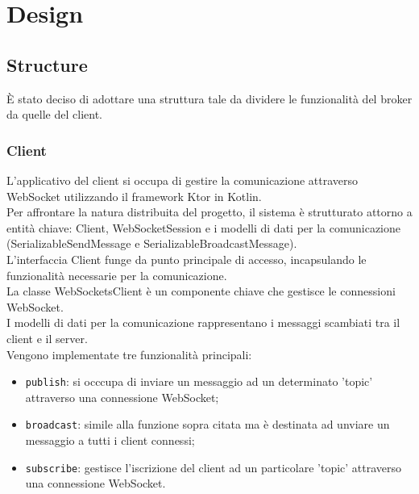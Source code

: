 \section{Design}




\subsection{Structure}

È stato deciso di adottare una struttura tale da dividere le funzionalità del broker da quelle del client.

\subsubsection{Client}

L'applicativo del client si occupa di gestire la comunicazione attraverso WebSocket utilizzando il framework Ktor in Kotlin. \\

Per affrontare la natura distribuita del progetto, il sistema è strutturato attorno a entità chiave: Client,
 WebSocketSession e i modelli di dati per la comunicazione (SerializableSendMessage e SerializableBroadcastMessage). \\
 
 L'interfaccia Client funge da punto principale di accesso, incapsulando le funzionalità necessarie per la comunicazione. \\
 
 La classe WebSocketsClient è un componente chiave che gestisce le connessioni WebSocket. \\
 
 I modelli di dati per la comunicazione rappresentano i messaggi scambiati tra il client e il server. \\

Vengono implementate tre funzionalità principali:
\begin{itemize}
    \item \texttt{publish}: si occcupa di inviare un messaggio ad un determinato 'topic' attraverso una connessione WebSocket;
    \item \texttt{broadcast}: simile alla funzione sopra citata ma è destinata ad unviare un messaggio a tutti i client connessi;
    \item \texttt{subscribe}: gestisce l'iscrizione del client ad un particolare 'topic' attraverso una connessione WebSocket.
\end{itemize}


